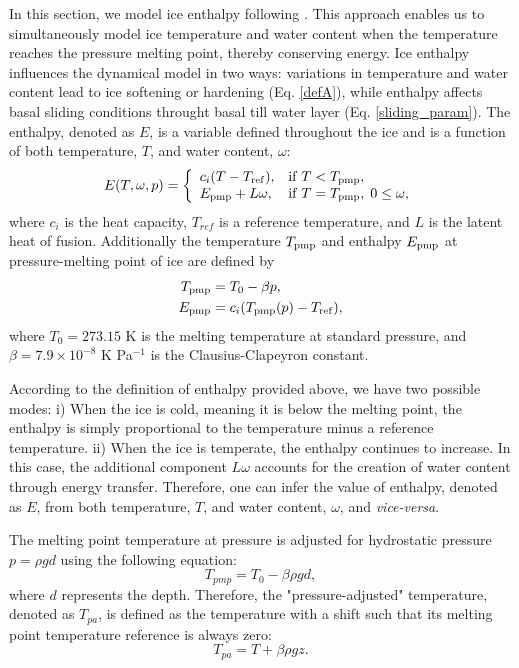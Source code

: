 \documentclass[10pt,twocolumn]{article}
\begin{document}
In this section, we model ice enthalpy following \citet{aschwanden2012enthalpy}.
This approach enables us to simultaneously model ice 
temperature and water content when the temperature reaches the pressure melting point, 
thereby conserving energy. Ice enthalpy influences the dynamical model in two ways: 
variations in temperature and water content lead to ice softening or hardening (Eq. \eqref{defA}), 
while enthalpy affects basal sliding conditions throught basal till water layer (Eq. \eqref{sliding_param}). 
The enthalpy, denoted as $E$, is a variable defined throughout the ice and 
is a function of both temperature, $T$, and water content, $\omega$:
\begin{align}
\label{def_enth}
E(T, \omega,p) = 
\left\{
\begin{array}{ll}
c_i (T- T_{\rm ref}), & {\rm  if } \; T < T_{\rm pmp} , \\ 
E_{\rm pmp} + L \omega, &  
{\rm if } \;  T = T_{\rm pmp},\; 0 \le \omega,
\end{array} 
\right.  
\end{align}
where $c_i$ is the heat capacity, $T_{ref}$ is a reference temperature, 
and $L$ is the latent heat of fusion. Additionally the temperature $T_{\rm pmp}$
and enthalpy $E_{\rm pmp}$ at pressure-melting point of ice are defined by   
\begin{align}
T_{\rm pmp} & = T_0 - \beta p, \label{defTpmp} \\
E_{\rm pmp} & = c_i (T_{\rm pmp}(p) - T_{\rm ref}), \label{defEpmp}
\end{align}  
where $T_0 = 273.15$ K is the melting temperature at standard pressure, and
$\beta = 7.9 \times 10^{-8}$ K Pa$^{-1}$ is the Clausius-Clapeyron constant. 

According to the definition of enthalpy provided above, we have two possible modes:
i) When the ice is cold, meaning it is below the melting point, the enthalpy is simply 
proportional to the temperature minus a reference temperature.
ii) When the ice is temperate, the enthalpy continues to increase. In this case, 
the additional component $L \omega$ accounts for the creation of water content 
through energy transfer. Therefore, one can infer the value of enthalpy, denoted as $E$, 
from both temperature, $T$, and water content, $\omega$, and \textit{vice-versa}.

The melting point temperature at pressure is adjusted for hydrostatic pressure 
$p = \rho g d$ using the following equation:
\begin{equation}
\label{Tpmp}
T_{pmp} = T_{0} - \beta \rho g d, 
\end{equation}
where $d$ represents the depth. Therefore, the "pressure-adjusted" temperature, 
denoted as $T_{pa}$, is defined as the temperature with a shift such that its 
melting point temperature reference is always zero:
$$ T_{pa} = T + \beta \rho g z. $$
\end{document}
